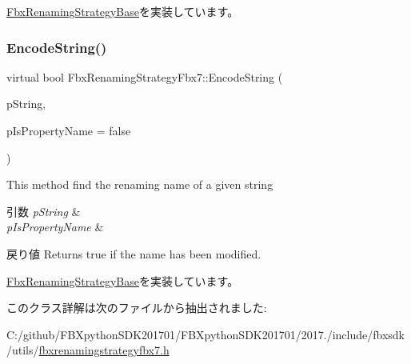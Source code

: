 \hyperlink{class_fbx_renaming_strategy_base_a7449fa6c649949d6d5e3c4b7190d6b25}{Fbx\+Renaming\+Strategy\+Base}を実装しています。

\mbox{\label{class_fbx_renaming_strategy_fbx7_ae7ce3bfd32c1cb7c8ac420972287760e}} 
\subsubsection{\texorpdfstring{Encode\+String()}{EncodeString()}}
{\footnotesize\ttfamily virtual bool Fbx\+Renaming\+Strategy\+Fbx7\+::\+Encode\+String (\begin{DoxyParamCaption}\item[{\hyperlink{class_fbx_name_handler}{Fbx\+Name\+Handler} \&}]{p\+String,  }\item[{bool}]{p\+Is\+Property\+Name = {\ttfamily false} }\end{DoxyParamCaption})\hspace{0.3cm}{\ttfamily [virtual]}}

This method find the renaming name of a given string 
\begin{DoxyParams}{引数}
{\em p\+String} & \\
\hline
{\em p\+Is\+Property\+Name} & \\
\hline
\end{DoxyParams}
\begin{DoxyReturn}{戻り値}
Returns true if the name has been modified. 
\end{DoxyReturn}


\hyperlink{class_fbx_renaming_strategy_base_aa762726a9d92a328ec720f2b8135db09}{Fbx\+Renaming\+Strategy\+Base}を実装しています。



このクラス詳解は次のファイルから抽出されました\+:\begin{DoxyCompactItemize}
\item 
C\+:/github/\+F\+B\+Xpython\+S\+D\+K201701/\+F\+B\+Xpython\+S\+D\+K201701/2017./include/fbxsdk/utils/\hyperlink{fbxrenamingstrategyfbx7_8h}{fbxrenamingstrategyfbx7.\+h}\end{DoxyCompactItemize}
